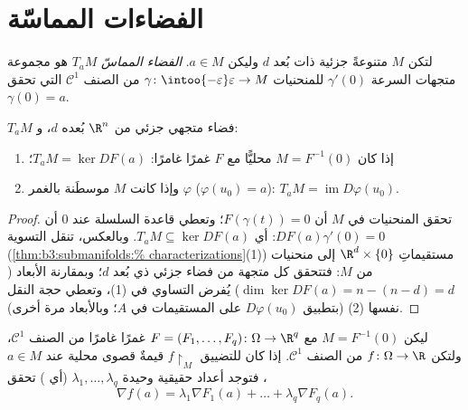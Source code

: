 \section{الفضاءات المماسّة}

\begin{definition}\label{def:b3:submanifolds:tangent}
لتكن $M$ متنوعةً جزئية ذات بُعد $d$ وليكن $a \in M$.
\emph{الفضاء المماسّ} $T_aM$ هو مجموعة متجهات
السرعة $\gamma'(0)$ للمنحنيات $\gamma \colon
\intoo{-\varepsilon}\varepsilon \to M$ من الصنف $\mathcal C^1$
التي تحقق $\gamma(0) = a$.
\end{definition}

\begin{proposition}\label{prop:b3:submanifolds:tangent}
$T_aM$ فضاء متجهي جزئي من $\R^n$ بُعده $d$، و:
\begin{enumerate}
  \item إذا كان $M = F^{-1}(0)$ محليًّا مع $F$ غمرًا غامرًا:
        $T_aM = \ker DF(a)$؛
  \item وإذا كانت $M$ موسطَنة بالغمر $\varphi$ ($\varphi(u_0) = a$):
        $T_aM =
        \operatorname{im}D\varphi(u_0)$.
\end{enumerate}
\end{proposition}

\begin{proof}
تحقق المنحنيات في $M$ أن $F(\gamma(t)) = 0$؛ وتعطي قاعدة السلسلة عند $0$ أن
$DF(a)\gamma'(0) = 0$: أي $T_aM \subseteq \ker DF(a)$. وبالعكس، تنقل التسوية (\cref{thm:b3:submanifolds:%
characterizations}(1))
مستقيماتِ $\R^d\times\{0\}$ إلى منحنيات من $M$: فتتحقق كل متجهة من فضاء
جزئي ذي بُعد $d$؛ وبمقارنة الأبعاد ($\dim\ker DF(a) = n - (n - d) = d$) يُفرض التساوي في
(1)، وتعطي حجة النقل نفسها (2) (بتطبيق $D\varphi(u_0)$ على
المستقيمات في $A$؛ وبالأبعاد مرة أخرى).
\end{proof}

\begin{theorem}
\label{thm:b3:submanifolds:lagrange}
ليكن $M = F^{-1}(0)$ مع $F = (F_1, \dots, F_q) \colon \Omega
\to \R^q$ غمرًا غامرًا من الصنف
$\mathcal C^1$، ولتكن $f \colon
\Omega \to \R$ من الصنف $\mathcal C^1$. إذا كان
للتضييق $f\restriction_M$ قيمةٌ قصوى محلية عند $a \in M$، فتوجد أعداد
حقيقية وحيدة $\lambda_1, \dots, \lambda_q$ (أي \emph{})
تحقق
\[
\nabla f(a) = \lambda_1\nabla F_1(a) + \dots +
\lambda_q\nabla F_q(a) .
\]
\end{theorem}

